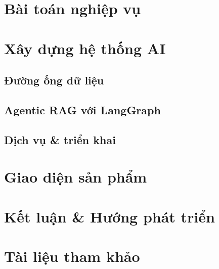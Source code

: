 


\section{Bài toán nghiệp vụ}



\section{Xây dựng hệ thống AI}
\subsection{Đường ống dữ liệu}





\subsection{Agentic RAG với LangGraph}




\subsection{Dịch vụ \& triển khai}


\section{Giao diện sản phẩm}




\section{Kết luận \& Hướng phát triển}



\section{Tài liệu tham khảo}


